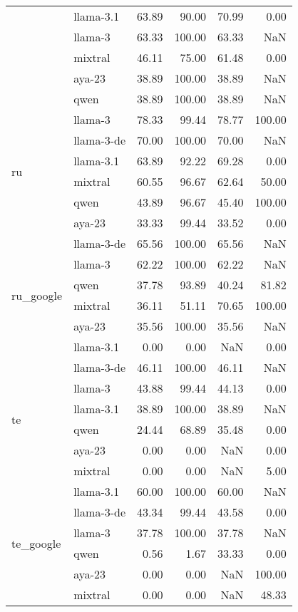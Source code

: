 \begin{tabular}{llrrrr}
 & llama-3.1 & 63.89 & 90.00 & 70.99 & 0.00 \\
 & llama-3 & 63.33 & 100.00 & 63.33 & NaN \\
 & mixtral & 46.11 & 75.00 & 61.48 & 0.00 \\
 & aya-23 & 38.89 & 100.00 & 38.89 & NaN \\
 & qwen & 38.89 & 100.00 & 38.89 & NaN \\
\cline{1-6}
\multirow[t]{6}{*}{ru} & llama-3 & 78.33 & 99.44 & 78.77 & 100.00 \\
 & llama-3-de & 70.00 & 100.00 & 70.00 & NaN \\
 & llama-3.1 & 63.89 & 92.22 & 69.28 & 0.00 \\
 & mixtral & 60.55 & 96.67 & 62.64 & 50.00 \\
 & qwen & 43.89 & 96.67 & 45.40 & 100.00 \\
 & aya-23 & 33.33 & 99.44 & 33.52 & 0.00 \\
\cline{1-6}
\multirow[t]{6}{*}{ru_google} & llama-3-de & 65.56 & 100.00 & 65.56 & NaN \\
 & llama-3 & 62.22 & 100.00 & 62.22 & NaN \\
 & qwen & 37.78 & 93.89 & 40.24 & 81.82 \\
 & mixtral & 36.11 & 51.11 & 70.65 & 100.00 \\
 & aya-23 & 35.56 & 100.00 & 35.56 & NaN \\
 & llama-3.1 & 0.00 & 0.00 & NaN & 0.00 \\
\cline{1-6}
\multirow[t]{6}{*}{te} & llama-3-de & 46.11 & 100.00 & 46.11 & NaN \\
 & llama-3 & 43.88 & 99.44 & 44.13 & 0.00 \\
 & llama-3.1 & 38.89 & 100.00 & 38.89 & NaN \\
 & qwen & 24.44 & 68.89 & 35.48 & 0.00 \\
 & aya-23 & 0.00 & 0.00 & NaN & 0.00 \\
 & mixtral & 0.00 & 0.00 & NaN & 5.00 \\
\cline{1-6}
\multirow[t]{6}{*}{te_google} & llama-3.1 & 60.00 & 100.00 & 60.00 & NaN \\
 & llama-3-de & 43.34 & 99.44 & 43.58 & 0.00 \\
 & llama-3 & 37.78 & 100.00 & 37.78 & NaN \\
 & qwen & 0.56 & 1.67 & 33.33 & 0.00 \\
 & aya-23 & 0.00 & 0.00 & NaN & 100.00 \\
 & mixtral & 0.00 & 0.00 & NaN & 48.33 \\

\end{tabular}
